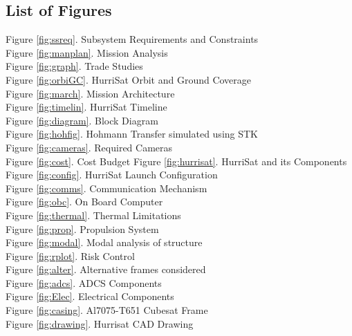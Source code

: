 \subsection{List of Figures}
Figure \ref{fig:ssreq}. Subsystem Requirements and Constraints\\
Figure \ref{fig:manplan}. Mission Analysis\\
Figure \ref{fig:graph}. Trade Studies\\
Figure \ref{fig:orbiGC}. HurriSat Orbit and Ground Coverage\\
Figure \ref{fig:march}. Mission Architecture\\
Figure \ref{fig:timelin}. HurriSat Timeline\\
Figure \ref{fig:diagram}. Block Diagram\\
Figure \ref{fig:hohfig}. Hohmann Transfer simulated using STK\\
Figure \ref{fig:cameras}. Required Cameras\\
Figure \ref{fig:cost}. Cost Budget
Figure \ref{fig:hurrisat}. HurriSat and its Components\\
Figure \ref{fig:config}. HurriSat Launch Configuration\\
Figure \ref{fig:comms}. Communication Mechanism\\
Figure \ref{fig:obc}. On Board Computer\\
Figure \ref{fig:thermal}. Thermal Limitations\\
Figure \ref{fig:prop}. Propulsion System\\
Figure \ref{fig:modal}. Modal analysis of structure \\
Figure \ref{fig:rplot}. Risk Control \\
Figure \ref{fig:alter}. Alternative frames considered\\
Figure \ref{fig:adcs}. ADCS Components\\
Figure \ref{fig:Elec}. Electrical Components\\
Figure \ref{fig:casing}. Al7075-T651 Cubesat Frame\\
Figure \ref{fig:drawing}. Hurrisat CAD Drawing\\
\newpage